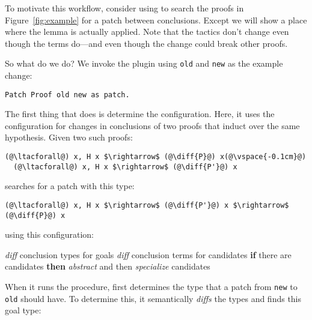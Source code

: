 To motivate this workflow, consider using \sysname to search the proofs in
Figure~\ref{fig:example} for a patch between conclusions.
Except we will show a place where the lemma is actually applied.
Note that the tactics don't change even though the terms do---and even though the change could break other proofs.

So what do we do?
We invoke the plugin using \lstinline{old} and \lstinline{new} as the example change:

\begin{lstlisting}[language=ml4]
  Patch Proof old new as patch.
\end{lstlisting}

The first thing that \sysname does is determine the configuration.
Here, it uses the configuration for changes in conclusions of two proofs
that induct over the same hypothesis. Given two such
proofs:

\begin{lstlisting}[language=coq]
  (@\ltacforall@) x, H x $\rightarrow$ (@\diff{P}@) x(@\vspace{-0.1cm}@)
  (@\ltacforall@) x, H x $\rightarrow$ (@\diff{P'}@) x
\end{lstlisting}
\sysname searches for a patch with this type:

\begin{lstlisting}[language=coq]
  (@\ltacforall@) x, H x $\rightarrow$ (@\diff{P'}@) x $\rightarrow$ (@\diff{P}@) x
\end{lstlisting}
using this configuration:

\begin{algorithm}
\footnotesize
\begin{algorithmic}[1]
    \STATE \textit{diff} conclusion types for goals
    \STATE \textit{diff} conclusion terms for candidates
    \STATE \textbf{if} there are candidates \textbf{then}
    \STATE \hspace*{1em} \textit{abstract} and then \textit{specialize} candidates
\end{algorithmic}
\end{algorithm}

When it runs the procedure,
\sysname first determines the type that a patch from \lstinline{new} to \lstinline{old} should have.
To determine this, it semantically \textit{diffs} the types and finds this goal type:

